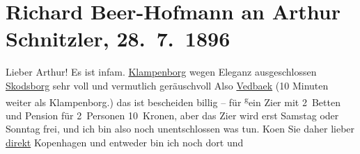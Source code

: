 

         
         \renewcommand{\erwaehntePersonen}{Personen: Richard Beer-Hofmann, Georg Brandes, Paul Goldmann}
         \renewcommand{\erwaehnteOrte}{Orte: Hotel König von Dänemark, Klampenborg, Kopenhagen, Skodsborg, Vedbæk}
         \renewcommand{\erwaehnteWerke}{}
               \section[Richard Beer-Hofmann an Arthur Schnitzler, 28. 7. 1896]{ Richard Beer-Hofmann an Arthur Schnitzler, 28. 7. 1896}\nopagebreak{}\rehead{ }\begin{ledgroupsized}[t]{13cm}\normalsize\beginnumbering{} \toendnotes[C]{\smallbreak\pagebreak[2]} 
\pstart
           \noindent{}{\pb}Lieber Arthur! Es ist
               infam.\pend
           \pstart
           \uline{Klampenborg} wegen Eleganz ausgeschlossen\pend
           \pstart
           \uline{Skodsborg} sehr voll und vermutlich geräuschvoll\pend
           \pstart
           Also \uline{Vedbaek} (10 Minuten weiter als Klampenborg.)\pend
           \pstart
           das ist bescheiden billig – für \substVorne{}\textsuperscript{g}\substDazwischen{}e\substHinten{}in Zi{\geminationm}er mit 2 Betten und Pension für 2 Personen
               10 Kronen, aber das Zi{\geminationm}er wird erst {\pb}Samstag oder Sonntag frei, und ich bin also noch
               unentschlossen was tun. Ko{\geminationm}en Sie daher lieber \uline{direkt}{ }Kopenhagen und entweder bin ich noch dort und

\end{ledgroupsized}
